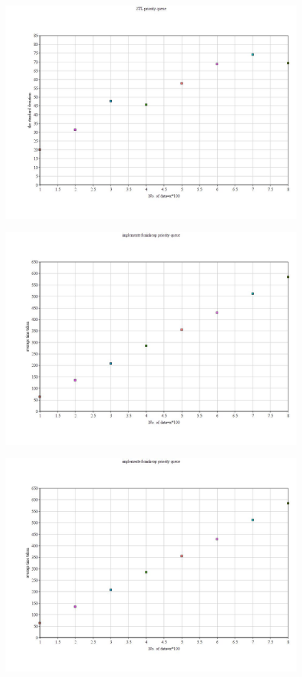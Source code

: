 \documentclass[11pt]{article} %
\begin{document}
\begin{figure}[ht!]
\centering
\includegraphics[width=120mm]{2.jpg}

\end{figure}
\begin{figure}[ht!]
\centering
\includegraphics[width=120mm]{3.jpg}

\end{figure}
\begin{figure}[ht!]
\centering
\includegraphics[width=120mm]{4.jpg}

\end{figure}
\end{document}
